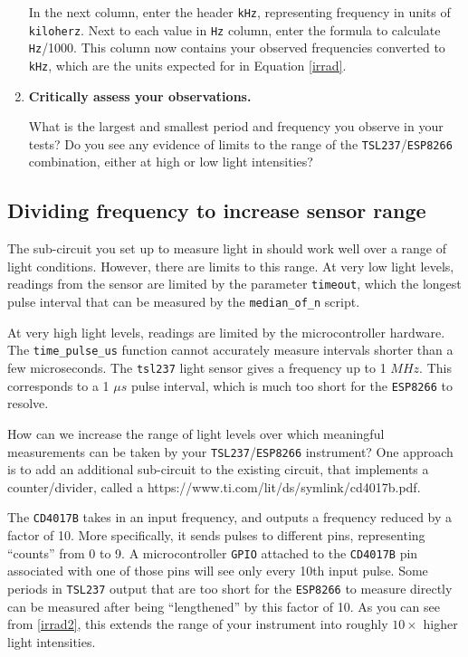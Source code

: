 \begin{enumerate}[resume]
	\smallskip
	In the next column, enter the header \texttt{kHz}, representing frequency in units of \texttt{kiloherz}.
	Next to each value in \texttt{Hz} column, enter the formula to calculate \texttt{Hz}/1000.
	This column now contains your observed frequencies converted to \texttt{kHz}, which are the units expected for in Equation \ref{irrad}.
	
	\item \textbf{Critically assess your observations.}
	
	What is the largest and smallest period and frequency you observe in your tests?
	Do you see any evidence of limits to the range of the \texttt{TSL237}/\texttt{ESP8266} combination, either at high or low light intensities?
\end{enumerate}


\subsection{Dividing frequency to increase sensor range}
The sub-circuit you set up to measure light in  should work well over a range of light conditions. 
However, there are limits to this range.
At very low light levels, readings from the sensor are limited by the parameter \texttt{timeout}, which the longest pulse interval that can be measured by the \lstinline{median_of_n} script.

At very high light levels, readings are limited by the microcontroller hardware.
The \lstinline{time_pulse_us} function cannot accurately measure intervals shorter than a few microseconds.
The \texttt{tsl237} light sensor gives a frequency up to 1 $MHz$.
This corresponds to a 1 $\mu s$ pulse interval, which is much too short for the \texttt{ESP8266} to resolve. 

How can we increase the range of light levels over which meaningful measurements can be taken by your \texttt{TSL237}/\texttt{ESP8266} instrument?
One approach is to add an additional sub-circuit to the existing circuit, that implements a counter/divider, called a  {https://www.ti.com/lit/ds/symlink/cd4017b.pdf}.

The \texttt{CD4017B} takes in an input frequency, and outputs a frequency reduced by a factor of 10.
More specifically, it sends pulses to different pins, representing ``counts'' from 0 to 9. 
A microcontroller \texttt{GPIO} attached to the \texttt{CD4017B} pin associated with one of those pins will see only every 10th input pulse. 
Some periods in \texttt{TSL237} output that are too short for the \texttt{ESP8266} to measure directly can be measured after being ``lengthened'' by  this factor of 10. 
As you can see from \ref{irrad2}, this extends the range of your instrument into roughly $10\times$ higher light intensities. 


